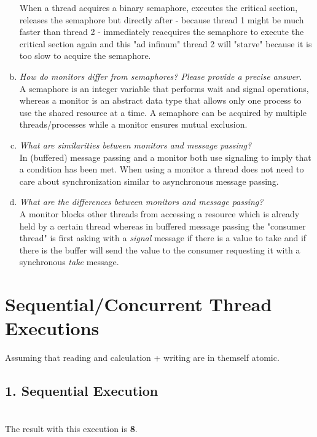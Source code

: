 \documentclass{report}
\begin{document}
\begin{enumerate}[a)]
			When a thread acquires a binary semaphore, executes the critical section, releases the semaphore but directly after - because thread 1 might be much faster than thread 2 - immediately reacquires the semaphore to execute the critical section again and this "ad infinum" thread 2 will "starve" because it is too slow to acquire the semaphore.
			\item \textit{How do monitors differ from semaphores? Please provide a precise answer.} \\
			A semaphore is an integer variable that performs wait and signal operations, whereas a monitor is an abstract data type that allows only one process to use the shared resource at a time. A semaphore can be acquired by multiple threads/processes while a monitor ensures mutual exclusion.
			\item \textit{What are similarities between monitors and message passing?} \\
			In (buffered) message passing and a monitor both use signaling to imply that a condition has been met. When using a monitor a thread does not need to care about synchronization similar to asynchronous message passing.
			\item \textit{What are the differences between monitors and message passing?} \\
			A monitor blocks other threads from accessing a resource which is already held by a certain thread whereas in buffered message passing the "consumer thread" is first asking with a \textit{signal} message if there is a value to take and if there is the buffer will send the value to the consumer requesting it with a synchronous \textit{take} message.
		\end{enumerate}
	\closesection
	
	\newpage
	
	\section{Sequential/Concurrent Thread Executions}
	\startsection
		Assuming that reading and calculation + writing are in themself atomic.
		\subsection{1. Sequential Execution}
		\startsubsection
			\hfill \\
			The result with this execution is \textbf{8}.
		\closesection
\end{document}
